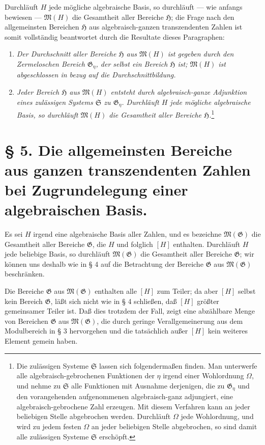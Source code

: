 \documentclass[11pt]{article}
\begin{document}
Durchläuft $H$ jede mögliche algebraische Basis, so durchläuft --- wie anfangs
bewiesen --- $\mathfrak M(H)$ die Gesamtheit aller Bereiche $\mathfrak H$; die
Frage nach den allgemeinsten Bereichen $\mathfrak H$ aus algebraisch-ganzen
transzendenten Zahlen ist somit vollständig beantwortet durch die Resultate dieses
Paragraphen:
\begin{enumerate}
\item[a)] \emph{Der Durchschnitt aller Bereiche $\mathfrak H$ aus
$\mathfrak M(H)$ ist gegeben durch den Zermeloschen Bereich $\mathfrak G_\eta$,
der selbst ein Bereich $\mathfrak H$ ist; $\mathfrak M(H)$ ist abgeschlossen in
bezug auf die Durchschnittbildung.}
\item[b)] \emph{Jeder Bereich $\mathfrak H$ aus $\mathfrak M(H)$ entsteht durch
algebraisch-ganze Adjunktion eines zulässigen Systems $\mathfrak S$ zu
$\mathfrak G_\eta$. Durchläuft $H$ jede mögliche algebraische Basis, so
durchläuft $\mathfrak M(H)$ die Gesamtheit aller Bereiche $\mathfrak H$.}\footnote{Die
zulässigen Systeme $\mathfrak S$ lassen sich folgendermaßen finden. Man
unterwerfe alle algebraisch-gebrochenen Funktionen der $\eta$ irgend einer
Wohlordnung $\Omega$, und nehme zu $\mathfrak S$ alle Funktionen mit Ausnahme
derjenigen, die zu $\mathfrak G_\eta$ und den vorangehenden aufgenommenen
algebraisch-ganz adjungiert, eine algebraisch-gebrochene Zahl erzeugen. Mit
diesem Verfahren kann an jeder beliebigen Stelle abgebrochen werden. Durchläuft
$\Omega$ jede Wohlordnung, und wird zu jedem festen $\Omega$ an jeder beliebigen
Stelle abgebrochen, so sind damit alle zulässigen Systeme $\mathfrak S$
erschöpft.}
\end{enumerate}




\section*{§ 5. Die allgemeinsten Bereiche aus ganzen transzendenten Zahlen bei Zugrundelegung einer algebraischen Basis.}

Es sei $H$ irgend eine algebraische Basis aller Zahlen, und es bezeichne
$\mathfrak M(\mathfrak G)$ die Gesamtheit aller Bereiche $\mathfrak G$, die $H$
und folglich $[H]$ enthalten. Durchläuft $H$ jede beliebige Basis, so
durchläuft $\mathfrak M(\mathfrak G)$ die Gesamtheit aller Bereiche
$\mathfrak G$; wir können uns deshalb wie in § 4 auf die Betrachtung der
Bereiche $\mathfrak G$ aus $\mathfrak M(\mathfrak G)$ beschränken.

Die Bereiche $\mathfrak G$ aus $\mathfrak M(\mathfrak G)$ enthalten alle
$[H]$ zum Teiler; da aber $[H]$ selbst kein Bereich $\mathfrak G$, läßt sich
nicht wie in § 4 schließen, daß $[H]$ größter gemeinsamer Teiler ist. Daß dies
trotzdem der Fall, zeigt eine abzählbare Menge von Bereichen $\mathfrak G$ aus
$\mathfrak M(\mathfrak G)$, die durch geringe Verallgemeinerung aus dem
Modulbereich in § 3 hervorgehen und die tatsächlich außer $[H]$ kein weiteres
Element gemein haben.
\end{document}
